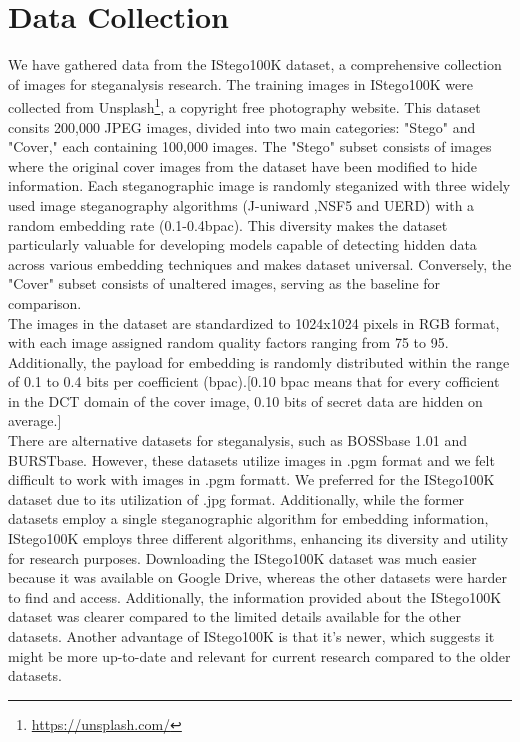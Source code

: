 \section{Data Collection} 
We have gathered data from the IStego100K dataset\cite{7}, a comprehensive collection of images for steganalysis research. The training images in IStego100K were collected from Unsplash\footnote{\url{https://unsplash.com/}}, a copyright free photography website. This dataset consits 200,000 JPEG images, divided into two main categories: "Stego" and "Cover," each containing 100,000 images. The "Stego" subset consists of images where the original cover images from the dataset have been modified to hide information. Each steganographic image is randomly steganized with three widely used image steganography algorithms (J-uniward\cite{22} ,NSF5\cite{17} and UERD\cite{13}) with a random embedding rate (0.1-0.4bpac). This diversity makes the dataset particularly valuable for developing models capable of detecting hidden data across various embedding techniques and makes dataset universal. Conversely, the "Cover" subset consists of unaltered images, serving as the baseline for comparison.\\
The images in the dataset are standardized to 1024x1024 pixels in RGB format, with each image assigned random quality factors ranging from 75 to 95. Additionally, the payload for embedding is randomly distributed within the range of 0.1 to 0.4 bits per coefficient (bpac).[0.10 bpac means that for every  cofficient in the DCT domain of the cover image, 0.10 bits of secret data are hidden on average.]\\
There are alternative datasets for steganalysis, such as BOSSbase 1.01 and BURSTbase. However, these datasets utilize images in .pgm format and we felt difficult to work with images in .pgm formatt. We preferred for the IStego100K dataset due to its utilization of .jpg format. Additionally, while the former datasets employ a single steganographic algorithm for embedding information, IStego100K employs three different algorithms, enhancing its diversity and utility for research purposes. Downloading the IStego100K dataset was much easier because it was available on Google Drive, whereas the other datasets were harder to find and access. Additionally, the information provided about the IStego100K dataset was clearer compared to the limited details available for the other datasets. Another advantage of IStego100K is that it's newer, which suggests it might be more up-to-date and relevant for current research compared to the older datasets. 

